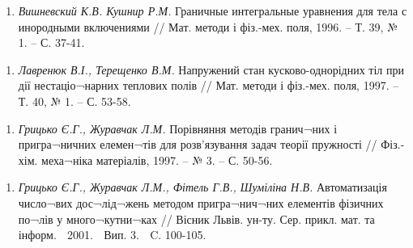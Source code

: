 \begin{enumerate}
\def\labelenumi{\arabic{enumi}.}
\tightlist
\item
  \protect\hypertarget{anchor-22}{}{}\emph{Вишневский К.В. Кушнир Р.М.}
  Граничные интегральные уравнения для тела с инородными включениями //
  Мат. методи і фіз.-мех. поля, 1996. -- Т. 39, № 1. -- С. 37-41.
\end{enumerate}

\begin{enumerate}
\def\labelenumi{\arabic{enumi}.}
\tightlist
\item
  \protect\hypertarget{anchor-23}{}{}\emph{Лавренюк В.І., Терещенко
  В.М.} Напружений стан кусково-однорідних тіл при дії нестаціо¬нарних
  теплових полів // Мат. методи і фіз.-мех. поля, 1997. -- Т. 40, № 1.
  -- С. 53-58.
\end{enumerate}

\begin{enumerate}
\def\labelenumi{\arabic{enumi}.}
\tightlist
\item
  \protect\hypertarget{anchor-25}{}{}\emph{Грицько Є.Г., Журавчак Л.М.}
  Порівняння методів гранич¬них і пригра¬ничних елемен¬тів для
  розв'язування задач теорії пружності // Фіз.-хім. меха¬ніка
  матеріалів, 1997. -- № 3. -- С. 50-56.
\end{enumerate}

\begin{enumerate}
\def\labelenumi{\arabic{enumi}.}
\tightlist
\item
  \protect\hypertarget{anchor-26}{}{}\emph{Грицько Є.Г., Журавчак Л.М.,
  Фітель Г.В., Шуміліна Н.В.} Автоматизація число¬вих дос¬лід¬жень
  методом пригра¬нич¬них елементів фізичних по¬лів у много¬кутни¬ках //
  Вісник Львів. ун-ту. Сер. прикл. мат. та інформ.  2001.  Вип. 3. 
  C. 100-105.
\end{enumerate}
